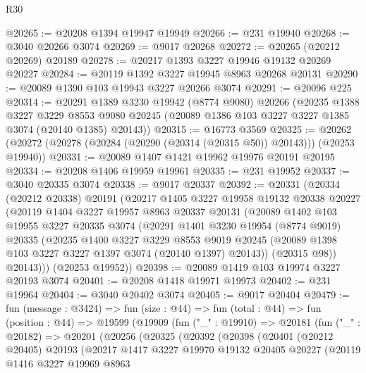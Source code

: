 \begin{lexlean}{R30}
\begin{coremodule}
@20265 := @20208 @1394 @19947 @19949
@20266 := @231 @19940
@20268 := @3040 @20266 @3074
@20269 := @9017 @20268
@20272 := @20265 (@20212 @20269) @20189
@20278 := @20217 @1393 @3227 @19946 @19132 @20269 @20227
@20284 := @20119 @1392 @3227 @19945 @8963 @20268 @20131
@20290 := @20089 @1390 @103 @19943 @3227 @20266 @3074
@20291 := @20096 @225
@20314 := @20291
    @1389
    @3230
    @19942
    (@8774 @9080)
    @20266
    (@20235
      @1388
      @3227
      @3229
      @8553
      @9080
      @20245
      (@20089 @1386 @103 @3227 @3227 @1385 @3074 (@20140 @1385) @20143))
@20315 := @16773 @3569
@20325 := @20262 (@20272 (@20278 (@20284 (@20290 (@20314 (@20315 @50)) @20143))) (@20253 @19940))
@20331 := @20089 @1407 @1421 @19962 @19976 @20191 @20195
@20334 := @20208 @1406 @19959 @19961
@20335 := @231 @19952
@20337 := @3040 @20335 @3074
@20338 := @9017 @20337
@20392 := @20331
    (@20334
      (@20212 @20338)
      @20191
      (@20217
        @1405
        @3227
        @19958
        @19132
        @20338
        @20227
        (@20119
          @1404
          @3227
          @19957
          @8963
          @20337
          @20131
          (@20089
            @1402
            @103
            @19955
            @3227
            @20335
            @3074
            (@20291
              @1401
              @3230
              @19954
              (@8774 @9019)
              @20335
              (@20235
                @1400
                @3227
                @3229
                @8553
                @9019
                @20245
                (@20089 @1398 @103 @3227 @3227 @1397 @3074 (@20140 @1397) @20143))
              (@20315 @98))
            @20143)))
      (@20253 @19952))
@20398 := @20089 @1419 @103 @19974 @3227 @20193 @3074
@20401 := @20208 @1418 @19971 @19973
@20402 := @231 @19964
@20404 := @3040 @20402 @3074
@20405 := @9017 @20404
@20479 := fun (message : @3424) =>
  fun (size : @44) =>
  fun (total : @44) =>
  fun (position : @44) =>
  @19599
    (@19909
      (fun ("_" : @19910) =>
      @20181
        (fun ("_" : @20182) =>
        @20201
          (@20256
            (@20325
              (@20392
                (@20398
                  (@20401
                    (@20212 @20405)
                    @20193
                    (@20217
                      @1417
                      @3227
                      @19970
                      @19132
                      @20405
                      @20227
                      (@20119
                        @1416
                        @3227
                        @19969
                        @8963

\end{coremodule}
\end{lexlean}
